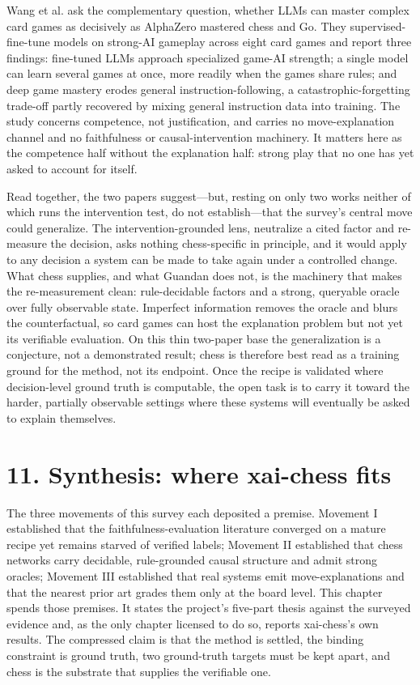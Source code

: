 \documentclass[conference]{IEEEtran}
\begin{document}
Wang et al. \cite{ref58} ask the complementary question, whether LLMs can master complex card games as decisively as AlphaZero mastered chess and Go. They supervised-fine-tune models on strong-AI gameplay across eight card games and report three findings: fine-tuned LLMs approach specialized game-AI strength; a single model can learn several games at once, more readily when the games share rules; and deep game mastery erodes general instruction-following, a catastrophic-forgetting trade-off partly recovered by mixing general instruction data into training. The study concerns competence, not justification, and carries no move-explanation channel and no faithfulness or causal-intervention machinery. It matters here as the competence half without the explanation half: strong play that no one has yet asked to account for itself.

Read together, the two papers suggest---but, resting on only two works neither of which runs the intervention test, do not establish---that the survey's central move could generalize. The intervention-grounded lens, neutralize a cited factor and re-measure the decision, asks nothing chess-specific in principle, and it would apply to any decision a system can be made to take again under a controlled change. What chess supplies, and what Guandan does not, is the machinery that makes the re-measurement clean: rule-decidable factors and a strong, queryable oracle over fully observable state. Imperfect information removes the oracle and blurs the counterfactual, so card games can host the explanation problem but not yet its verifiable evaluation. On this thin two-paper base the generalization is a conjecture, not a demonstrated result; chess is therefore best read as a training ground for the method, not its endpoint. Once the recipe is validated where decision-level ground truth is computable, the open task is to carry it toward the harder, partially observable settings where these systems will eventually be asked to explain themselves.

\section*{11. Synthesis: where xai-chess fits}
The three movements of this survey each deposited a premise. Movement I established that the faithfulness-evaluation literature converged on a mature recipe yet remains starved of verified labels; Movement II established that chess networks carry decidable, rule-grounded causal structure and admit strong oracles; Movement III established that real systems emit move-explanations and that the nearest prior art grades them only at the board level. This chapter spends those premises. It states the project's five-part thesis against the surveyed evidence and, as the only chapter licensed to do so, reports xai-chess's own results. The compressed claim is that the method is settled, the binding constraint is ground truth, two ground-truth targets must be kept apart, and chess is the substrate that supplies the verifiable one.
\end{document}
